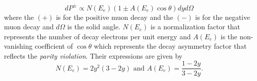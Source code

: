 \documentclass{outhesis}
\begin{document}
\begin{equation}
dP^{\pm} \propto N\left(E_e\right)\left(1 \pm A(E_e)\cos \theta \right) dy d\Omega
\label{eq:prob}
\end{equation}
where the $(+)$ is for the positive muon decay and the $(-)$ is for the negative muon decay and $d\Omega$ is the solid angle. $N\left(E_e\right)$ is a normalization factor that represents the number of decay electrons per unit energy and $A\left(E_e\right)$ is the non-vanishing coefficient of $\cos \theta$ which represents the decay asymmetry factor that reflects the \emph{parity violation}. Their expressions are given by
\begin{equation}
N\left(E_e\right) = 2y^2\left(3-2y\right)  \,\,  \text{and}  \,\,  A\left(E_e\right) = \frac{1-2y}{3-2y}.
\label{eq:na}
\end{equation}
\end{document}
